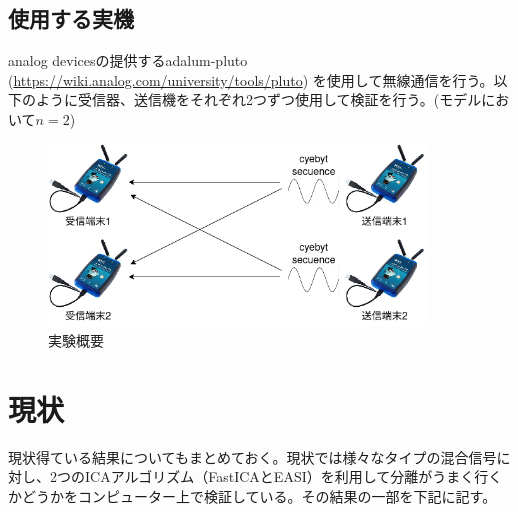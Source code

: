 \documentclass{jsarticle}
\begin{document}
\subsection{使用する実機}
analog devicesの提供するadalum-pluto
(\url{https://wiki.analog.com/university/tools/pluto})
を使用して無線通信を行う。以下のように受信器、送信機をそれぞれ2つずつ使用して検証を行う。(モデルにおいて$n=2$)

\begin{figure}[!htbp]
    \begin{center}
        \includegraphics[width=10cm]{img/3device.png}
        \caption{実験概要}
        \label{img:3device}
    \end{center}
\end{figure}

\section{現状}
現状得ている結果についてもまとめておく。現状では様々なタイプの混合信号に対し、2つのICAアルゴリズム（FastICA\cite{fastica}とEASI\cite{easi}）を利用して分離がうまく行くかどうかをコンピューター上で検証している。その結果の一部を下記に記す。
\end{document}
